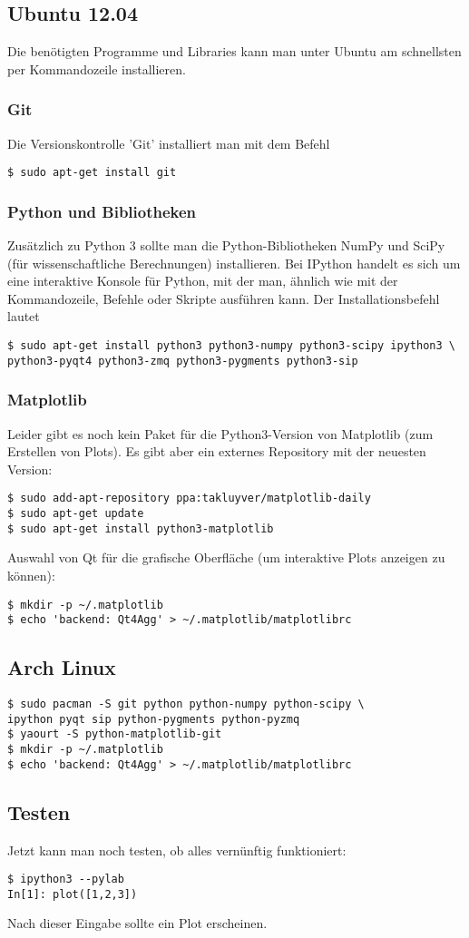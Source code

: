 \subsection{Ubuntu 12.04}
Die benötigten Programme und Libraries kann man unter Ubuntu am schnellsten per Kommandozeile installieren.

\subsubsection{Git}
Die Versionskontrolle 'Git' installiert man mit dem Befehl
\begin{verbatim}
$ sudo apt-get install git
\end{verbatim}

\subsubsection{Python und Bibliotheken}
Zusätzlich zu Python 3 sollte man die Python-Bibliotheken NumPy und SciPy (für wissenschaftliche Berechnungen) installieren.
Bei IPython handelt es sich um eine interaktive Konsole für Python, mit der man, ähnlich wie mit der Kommandozeile, Befehle oder Skripte ausführen kann.
Der Installationsbefehl lautet
\begin{verbatim}
$ sudo apt-get install python3 python3-numpy python3-scipy ipython3 \
python3-pyqt4 python3-zmq python3-pygments python3-sip
\end{verbatim}

\subsubsection{Matplotlib}
Leider gibt es noch kein Paket für die Python3-Version von Matplotlib (zum Erstellen von Plots).
Es gibt aber ein externes Repository mit der neuesten Version:
\begin{verbatim}
$ sudo add-apt-repository ppa:takluyver/matplotlib-daily
$ sudo apt-get update
$ sudo apt-get install python3-matplotlib
\end{verbatim}
Auswahl von Qt für die grafische Oberfläche (um interaktive Plots anzeigen zu können):
\begin{verbatim}
$ mkdir -p ~/.matplotlib
$ echo 'backend: Qt4Agg' > ~/.matplotlib/matplotlibrc
\end{verbatim}

\subsection{Arch Linux}
\begin{verbatim}
$ sudo pacman -S git python python-numpy python-scipy \
ipython pyqt sip python-pygments python-pyzmq
$ yaourt -S python-matplotlib-git
$ mkdir -p ~/.matplotlib
$ echo 'backend: Qt4Agg' > ~/.matplotlib/matplotlibrc
\end{verbatim}

\subsection{Testen}
Jetzt kann man noch testen, ob alles vernünftig funktioniert:
\begin{verbatim}
$ ipython3 --pylab
In[1]: plot([1,2,3])
\end{verbatim}
Nach dieser Eingabe sollte ein Plot erscheinen.
